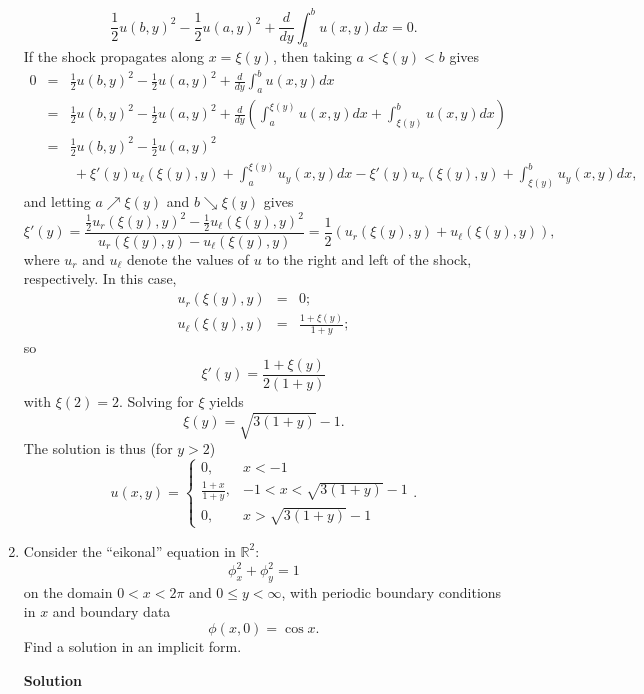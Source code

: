 \documentclass{article}
\begin{document}
\begin{enumerate}
\[\frac{1}{2} u(b,y)^2 - \frac{1}{2} u(a,y)^2 + \frac{d}{dy} \int_a^b u(x,y) dx = 0.\]
If the shock propagates along \(x = \xi(y)\), then taking \(a < \xi(y) < b\) gives
\begin{eqnarray*}
0 & = & \frac{1}{2} u(b,y)^2 - \frac{1}{2} u(a,y)^2 + \frac{d}{dy} \int_a^b u(x,y) dx \\
  & = & \frac{1}{2} u(b,y)^2 - \frac{1}{2} u(a,y)^2 + \frac{d}{dy} \left( \int_a^{\xi(y)} u(x,y) dx + \int_{\xi(y)}^b u(x,y) dx \right) \\
  & = & \frac{1}{2} u(b,y)^2 - \frac{1}{2} u(a,y)^2 \\
  &   & \ + \xi'(y) u_{\ell}(\xi(y),y) + \int_a^{\xi(y)} u_y(x,y) dx - \xi'(y) u_r(\xi(y),y) + \int_{\xi(y)}^b u_y(x,y) dx,
\end{eqnarray*}
and letting \(a \nearrow \xi(y)\) and \(b \searrow \xi(y)\) gives
\[\xi'(y) = \frac{\frac{1}{2} u_r(\xi(y),y)^2 - \frac{1}{2} u_{\ell}(\xi(y),y)^2}{u_r(\xi(y),y) - u_{\ell}(\xi(y),y)} = \frac{1}{2} \left( u_r(\xi(y),y) + u_{\ell}(\xi(y),y) \right),\]
where \(u_r\) and \(u_{\ell}\) denote the values of \(u\) to the right and left of the shock, respectively.  In this case,
\begin{eqnarray*}
u_r(\xi(y),y) & = & 0; \\
u_{\ell}(\xi(y),y) & = & \frac{1 + \xi(y)}{1 + y};
\end{eqnarray*}
so
\[\xi'(y) = \frac{1 + \xi(y)}{2(1 + y)}\]
with \(\xi(2) = 2\).  Solving for \(\xi\) yields
\[\xi(y) = \sqrt{3 (1 + y)} - 1.\]
The solution is thus (for \(y > 2\))
\[u(x,y) = \begin{cases} 0, & x < -1 \\ \frac{1 + x}{1 + y}, & -1 < x < \sqrt{3 (1 + y)} - 1 \\ 0, & x > \sqrt{3 (1 + y)} - 1 \end{cases}.\]



\item Consider the ``eikonal'' equation in \(\mathbb{R}^2\):
\[\phi_x^2 + \phi_y^2 = 1\]
on the domain \(0 < x < 2\pi\) and \(0 \leq y < \infty\), with periodic boundary conditions in \(x\) and boundary data
\[\phi(x,0) = \cos x.\]
Find a solution in an implicit form.

{\bf Solution}


\end{enumerate}
\end{document}
